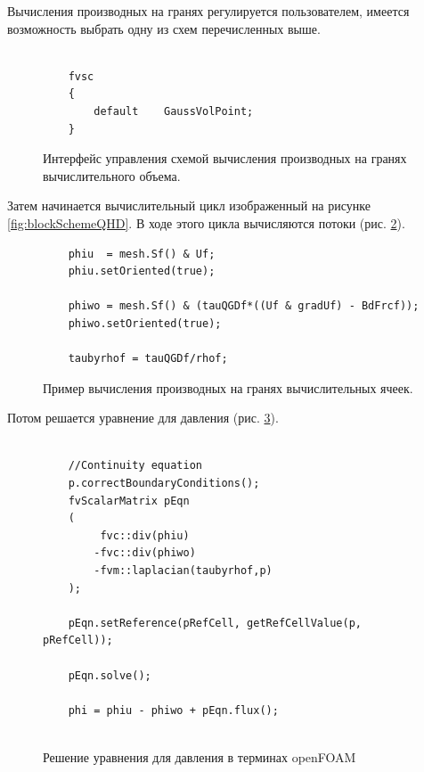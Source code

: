Вычисления производных на гранях регулируется пользователем, имеется возможность выбрать одну из схем перечисленных выше.

\begin{figure}
    \centering
    
\begin{lstlisting}

    fvsc
    {
        default    GaussVolPoint;
    }

\end{lstlisting}

    \caption{Интерфейс управления схемой вычисления производных на гранях вычислительного объема.}
    \label{fig:fvscList}
\end{figure}

Затем начинается вычислительный цикл изображенный на рисунке \ref{fig:blockSchemeQHD}. В ходе этого цикла вычисляются потоки (рис. \ref{fig:fluxes}).

\begin{figure}
    \centering
    \begin{lstlisting}
    phiu  = mesh.Sf() & Uf;
    phiu.setOriented(true);
    
    phiwo = mesh.Sf() & (tauQGDf*((Uf & gradUf) - BdFrcf));
    phiwo.setOriented(true);
    
    taubyrhof = tauQGDf/rhof;
    \end{lstlisting}
    \caption{Пример вычисления производных на гранях вычислительных ячеек.}
    \label{fig:fluxes}
\end{figure}

Потом решается уравнение для давления (рис. \ref{fig:peqn}).

\begin{figure}
    \centering
    \begin{lstlisting}
    
    //Continuity equation
    p.correctBoundaryConditions();
    fvScalarMatrix pEqn
    (
         fvc::div(phiu)
        -fvc::div(phiwo)
        -fvm::laplacian(taubyrhof,p)
    );
    
    pEqn.setReference(pRefCell, getRefCellValue(p, pRefCell));
    
    pEqn.solve();
    
    phi = phiu - phiwo + pEqn.flux();
    
    \end{lstlisting}
\caption{Решение уравнения для давления в терминах openFOAM}
\label{fig:peqn}
\end{figure}

